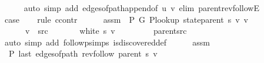 \begin{isabellebody}
\ \ \ \ \isamarkupfalse%
\ {\isacharparenleft}{\kern0pt}auto\ simp\ add{\isacharcolon}{\kern0pt}\ edges{\isacharunderscore}{\kern0pt}of{\isacharunderscore}{\kern0pt}path{\isacharunderscore}{\kern0pt}append{\isacharunderscore}{\kern0pt}{}{\isacharbrackleft}{\kern0pt}of\ {\isachardoublequoteopen}{\isacharbrackleft}{\kern0pt}u{\isacharcomma}{\kern0pt}\ v{\isacharbrackright}{\kern0pt}{\isachardoublequoteclose}{\isacharbrackright}{\kern0pt}\ elim{\isacharcolon}{\kern0pt}\ parent{\isacharunderscore}{\kern0pt}rev{\isacharunderscore}{\kern0pt}followE{\isacharparenright}{\kern0pt}\isanewline
{}\isamarkupfalse%
\isanewline
\ \ \isamarkupfalse%
\ {}\isanewline
\ \ \isamarkupfalse%
\ {\isacharquery}{\kern0pt}case\isanewline
\ \ \isamarkupfalse%
\ {\isacharparenleft}{\kern0pt}rule\ ccontr{\isacharparenright}{\kern0pt}\isanewline
\ \ \ \ \isamarkupfalse%
\ assm{\isacharcolon}{\kern0pt}\ {\isachardoublequoteopen}{\isasymnot}\ P{\isacharprime}{\kern0pt}\ G{}\ {\isacharparenleft}{\kern0pt}P{\isacharunderscore}{\kern0pt}lookup\ {\isacharparenleft}{\kern0pt}state{\isachardot}{\kern0pt}parent\ s{\isacharparenright}{\kern0pt}\ v{\isacharparenright}{\kern0pt}\ v{\isachardoublequoteclose}\isanewline
\ \ \ \ \isamarkupfalse%
\isanewline
\ \ \ \ \ \ {\isachardoublequoteopen}v\ {\isasymnoteq}\ src{\isachardoublequoteclose}\isanewline
\ \ \ \ \ \ {\isachardoublequoteopen}{\isasymnot}\ white\ s\ v{\isachardoublequoteclose}\isanewline
\ \ \ \ \ \ \isamarkupfalse%
\ {}\ parent{\isacharunderscore}{\kern0pt}src\isanewline
\ \ \ \ \ \ \isamarkupfalse%
\ {\isacharparenleft}{\kern0pt}auto\ simp\ add{\isacharcolon}{\kern0pt}\ follow{\isacharunderscore}{\kern0pt}psimps\ is{\isacharunderscore}{\kern0pt}discovered{\isacharunderscore}{\kern0pt}def{\isacharparenright}{\kern0pt}\isanewline
\ \ \ \ \isamarkupfalse%
\ assm\isanewline
\ \ \ \ \isamarkupfalse%
\ {\isachardoublequoteopen}{\isasymnot}\ P{\isacharprime}{\kern0pt}{\isacharprime}{\kern0pt}\ {\isacharparenleft}{\kern0pt}last\ {\isacharparenleft}{\kern0pt}edges{\isacharunderscore}{\kern0pt}of{\isacharunderscore}{\kern0pt}path\ {\isacharparenleft}{\kern0pt}rev{\isacharunderscore}{\kern0pt}follow\ {\isacharparenleft}{\kern0pt}parent\ s{\isacharparenright}{\kern0pt}\ v{\isacharparenright}{\kern0pt}{\isacharparenright}{\kern0pt}{\isacharparenright}{\kern0pt}{\isachardoublequoteclose}\isanewline
\ \ \ \ \ \ \isamarkupfalse%

\end{isabellebody}
